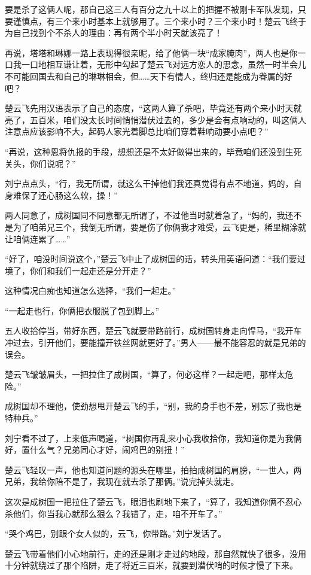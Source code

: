 要是杀了这俩人呢，那自己这三人有百分之九十以上的把握不被刚卡军队发现，只要谨慎点，有三个来小时基本上就够用了。三个来小时？三个来小时！楚云飞终于为自己找到个不杀人的理由：再有两个半小时天就该亮了！

再说，塔塔和琳娜一路上表现得很亲昵，给了他俩一块“成家腌肉”，两人也是你一口我一口地相互谦让着，无形中勾起了楚云飞对远方恋人的思念，虽然一时半会儿不可能回国去和自己的琳琳相会，但……天下有情人，终归还是能成为眷属的好吧？

楚云飞先用汉语表示了自己的态度，“这两人算了杀吧，毕竟还有两个来小时天就亮了，五百米，咱们没太长时间悄悄潜伏过去的，多少是会有点响动的，叫这俩人注意点应该影响不大，起码人家光着脚总比咱们穿着鞋响动要小点吧？”

“再说，这种恩将仇报的手段，想想还是不太好做得出来的，毕竟咱们还没到生死关头，你们说呢？”

刘宁点点头，“行，我无所谓，就这么干掉他们我还真觉得有点不地道，妈的，自身难保了还心肠这么软，操！”

两人同意了，成树国同不同意都无所谓了，不过他当时就着急了，“妈的，我还不是为了咱弟兄三个，我倒无所谓，要是伤了你俩我才难受，云飞更是，稀里糊涂就让咱俩连累了……”

“好了，咱没时间说这个，”楚云飞中止了成树国的话，转头用英语问道：“我们要过境了，你们和我们一起走还是分开走？”

这种情况白痴也知道怎么选择，“我们一起走。”

“一起走也行，你俩把衣服脱了包到脚上。”

五人收拾停当，带好东西，楚云飞就要带路前行，成树国转身走向悍马，“我开车冲过去，引开他们，要能撞开铁丝网就更好了。”男人——最不能容忍的就是兄弟的误会。

楚云飞皱皱眉头，一把拉住了成树国，“算了，何必这样？一起走吧，那样太危险。”

成树国却不理他，使劲想甩开楚云飞的手，“别，我的身手也不差，别忘了我也是特种兵。”

刘宁看不过了，上来低声喝道，“树国你再乱来小心我收拾你，我知道你是为我俩好，置什么气？兄弟同心才好，闹鸡巴的别扭！”

楚云飞轻叹一声，他也知道问题的源头在哪里，拍拍成树国的肩膀，“一世人，两兄弟，我给你陪不是了，我现在就去杀了那俩。”说完掉头就走。

这次是成树国一把拉住了楚云飞，眼泪也刷地下来了，“算了，我知道你俩不忍心杀他们，你当我心就那么狠么？我错了，走，咱不开车了。”

“哭个鸡巴，别跟个女人似的，云飞，你带路。”刘宁发话了。

楚云飞带着他们小心地前行，走的还是刚才走过的地段，那自然就快了很多，没用十分钟就绕过了那个陷阱，走了将近三百米，就要到潜伏哨的时候才慢了下来。

